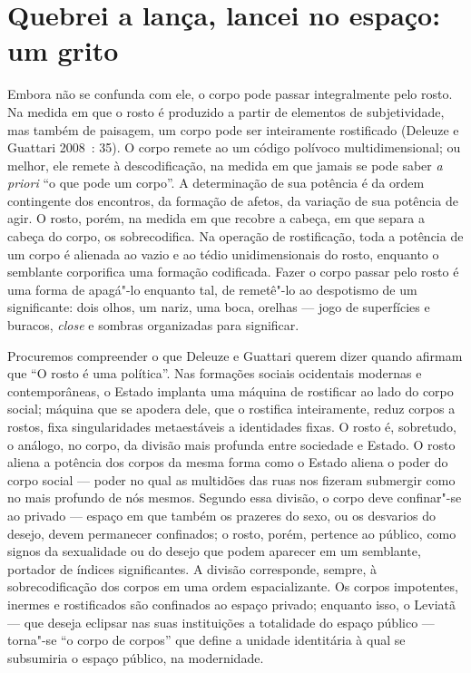 \section{Quebrei a lança, lancei no espaço: um grito}

Embora não se confunda com ele, o corpo pode passar integralmente pelo
rosto. Na medida em que o rosto é produzido a partir de elementos de
subjetividade, mas também de paisagem, um corpo pode ser inteiramente
rostificado (Deleuze e Guattari 2008~: 35). O corpo remete ao um código
polívoco multidimensional; ou melhor, ele remete à descodificação, na
medida em que jamais se pode saber \emph{a priori} ``o que pode um
corpo''. A determinação de sua potência é da ordem contingente dos
encontros, da formação de afetos, da variação de sua potência de agir. O
rosto, porém, na medida em que recobre a cabeça, em que separa a cabeça
do corpo, os sobrecodifica. Na operação de rostificação, toda a potência
de um corpo é alienada ao vazio e ao tédio unidimensionais do rosto,
enquanto o semblante corporifica uma formação codificada. Fazer o corpo
passar pelo rosto é uma forma de apagá"-lo enquanto tal, de remetê"-lo ao
despotismo de um significante: dois olhos, um nariz, uma boca, orelhas
--- jogo de superfícies e buracos, \emph{close} e sombras organizadas
para significar.

Procuremos compreender o que Deleuze e Guattari querem dizer quando
afirmam que ``O rosto é uma política''. Nas formações sociais ocidentais
modernas e contemporâneas, o Estado implanta uma máquina de rostificar
ao lado do corpo social; máquina que se apodera dele, que o rostifica
inteiramente, reduz corpos a rostos, fixa singularidades metaestáveis a
identidades fixas. O rosto é, sobretudo, o análogo, no corpo, da divisão
mais profunda entre sociedade e Estado. O rosto aliena a potência dos
corpos da mesma forma como o Estado aliena o poder do corpo social ---
poder no qual as multidões das ruas nos fizeram submergir como no mais
profundo de nós mesmos. Segundo essa divisão, o corpo deve confinar"-se
ao privado --- espaço em que também os prazeres do sexo, ou os desvarios
do desejo, devem permanecer confinados; o rosto, porém, pertence ao
público, como signos da sexualidade ou do desejo que podem aparecer em
um semblante, portador de índices significantes. A divisão corresponde,
sempre, à sobrecodificação dos corpos em uma ordem espacializante. Os
corpos impotentes, inermes e rostificados são confinados ao espaço
privado; enquanto isso, o Leviatã --- que deseja eclipsar nas suas
instituições a totalidade do espaço público --- torna"-se ``o corpo de
corpos'' que define a unidade identitária à qual se subsumiria o espaço
público, na modernidade.

